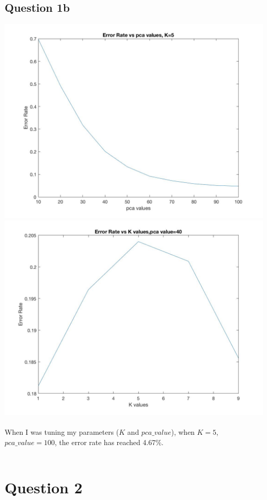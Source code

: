 \documentclass[11pt]{article} %
\begin{document}
\subsection{Question 1b}
\includegraphics[scale = 0.4]{e121.jpg}\\
\includegraphics[scale = 0.4]{e122.jpg}\\\\
When I was tuning my parameters ($K$ and $pca\_ value$), when $K=5$, $pca\_ value = 100$, the error rate has reached 4.67$\%$.\\\\


\section{Question 2}
\end{document}
